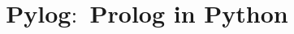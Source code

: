 \documentclass{llncs} %
\begin{document}
\title{Pylog$\colon$ Prolog in Python}
\maketitle






%


%


\end{document}
